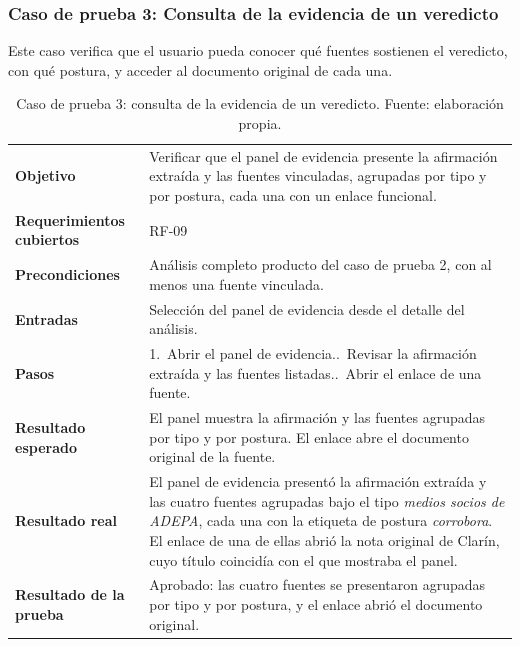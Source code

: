 \subsubsection{Caso de prueba 3: Consulta de la evidencia de un veredicto}

Este caso verifica que el usuario pueda conocer qué fuentes sostienen el veredicto, con qué postura, y acceder al documento original de cada una.

\begin{small}
\begin{longtable}{@{}>{\raggedright\arraybackslash}p{3.4cm} p{11.8cm}@{}}
  \caption{Caso de prueba 3: consulta de la evidencia de un veredicto. Fuente: elaboración propia.}
  \label{tab:cp-03} \\
    \hline
    \textbf{Objetivo} & Verificar que el panel de evidencia presente la afirmación extraída y las fuentes vinculadas, agrupadas por tipo y por postura, cada una con un enlace funcional. \\
    \textbf{Requerimientos cubiertos} & RF-09 \\
    \textbf{Precondiciones} & Análisis completo producto del caso de prueba 2, con al menos una fuente vinculada. \\
    \textbf{Entradas} & Selección del panel de evidencia desde el detalle del análisis. \\
    \textbf{Pasos} & 1.~Abrir el panel de evidencia.\newline 2.~Revisar la afirmación extraída y las fuentes listadas.\newline 3.~Abrir el enlace de una fuente. \\
    \textbf{Resultado esperado} & El panel muestra la afirmación y las fuentes agrupadas por tipo y por postura. El enlace abre el documento original de la fuente. \\
    \textbf{Resultado real} & El panel de evidencia presentó la afirmación extraída y las cuatro fuentes agrupadas bajo el tipo \emph{medios socios de ADEPA}, cada una con la etiqueta de postura \emph{corrobora}. El enlace de una de ellas abrió la nota original de Clarín, cuyo título coincidía con el que mostraba el panel. \\
    \textbf{Resultado de la prueba} & Aprobado: las cuatro fuentes se presentaron agrupadas por tipo y por postura, y el enlace abrió el documento original. \\
    \hline
\end{longtable}
\end{small}

